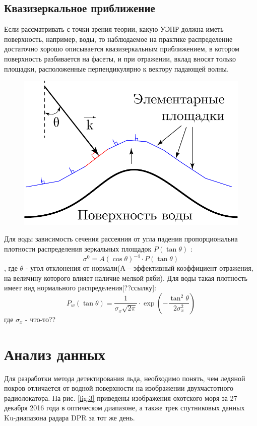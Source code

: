 \subsection{Квазизеркальное приближение}
Если рассматривать с точки зрения теории, какую УЭПР должна иметь поверхность, например, воды, то наблюдаемое на
практике распределение достаточно хорошо описывается квазизеркальным приближением, в котором поверхность разбивается на
фасеты, и при отражении, вклад вносят только площадки, расположенные перпендикулярно к вектору падающей волны.

\begin{figure}[h!]
  \centering
  \includegraphics[width = .45\linewidth]{img/kvaz.png}
  \caption{}
  \label{fig:2}
\end{figure}

Для воды зависимость сечения рассеяния от угла падения пропорциональна плотности распределения зеркальных площадок
$P(\tan \theta)$  \cite{bassfuks}:
\begin{equation}
  \sigma^0 = A (\cos \theta)^{-4} \cdot P(\tan \theta)
  \label{eq:3}
\end{equation}
, где $\theta$ - угол отклонения от нормали(А – эффективный коэффициент отражения, на величину которого влияет наличие
мелкой ряби). Для воды такая плотность имеет вид нормального распределения[??ссылку]:
\begin{equation}
  P_w(\tan \theta) = \frac{1}{\sigma_x \sqrt{2 \pi}} \cdot \exp (- \frac{\tan^2\theta}{2 \sigma^2_x})
  \label{eq:4}
\end{equation}
где $\sigma_x$ - что-то??

\section{Анализ данных}
Для разработки метода детектирования льда, необходимо понять, чем ледяной покров отличается от водной поверхности на
изображении двухчастотного радиолокатора. На рис. \ref{fig:3} приведены изображения охотского моря за 27 декабря 2016
года в оптическом диапазоне, а также трек спутниковых данных Ku-диапазона радара DPR за тот же день.

